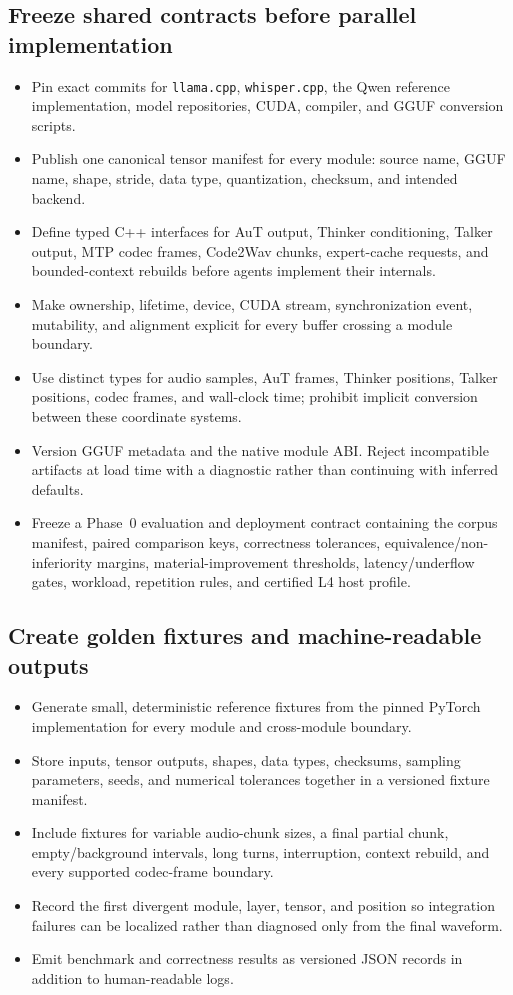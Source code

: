 \documentclass[10pt,letterpaper]{article}
\newcommand{\code}[1]{\texttt{#1}}
\begin{document}
\subsection{Freeze shared contracts before parallel implementation}
\begin{itemize}
    \item Pin exact commits for \code{llama.cpp}, \code{whisper.cpp}, the Qwen reference implementation, model repositories, CUDA, compiler, and GGUF conversion scripts.
    \item Publish one canonical tensor manifest for every module: source name, GGUF name, shape, stride, data type, quantization, checksum, and intended backend.
    \item Define typed C++ interfaces for AuT output, Thinker conditioning, Talker output, MTP codec frames, Code2Wav chunks, expert-cache requests, and bounded-context rebuilds before agents implement their internals.
    \item Make ownership, lifetime, device, CUDA stream, synchronization event, mutability, and alignment explicit for every buffer crossing a module boundary.
    \item Use distinct types for audio samples, AuT frames, Thinker positions, Talker positions, codec frames, and wall-clock time; prohibit implicit conversion between these coordinate systems.
    \item Version GGUF metadata and the native module ABI. Reject incompatible artifacts at load time with a diagnostic rather than continuing with inferred defaults.
    \item Freeze a Phase~0 evaluation and deployment contract containing the corpus manifest, paired comparison keys, correctness tolerances, equivalence/non-inferiority margins, material-improvement thresholds, latency/underflow gates, workload, repetition rules, and certified L4 host profile.
\end{itemize}

\subsection{Create golden fixtures and machine-readable outputs}
\begin{itemize}
    \item Generate small, deterministic reference fixtures from the pinned PyTorch implementation for every module and cross-module boundary.
    \item Store inputs, tensor outputs, shapes, data types, checksums, sampling parameters, seeds, and numerical tolerances together in a versioned fixture manifest.
    \item Include fixtures for variable audio-chunk sizes, a final partial chunk, empty/background intervals, long turns, interruption, context rebuild, and every supported codec-frame boundary.
    \item Record the first divergent module, layer, tensor, and position so integration failures can be localized rather than diagnosed only from the final waveform.
    \item Emit benchmark and correctness results as versioned JSON records in addition to human-readable logs.
\end{itemize}
\end{document}
